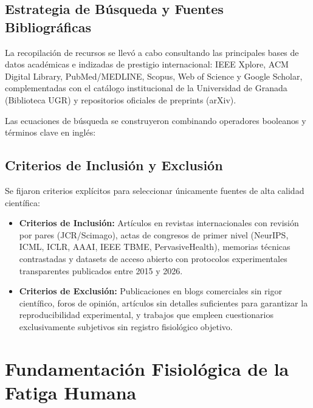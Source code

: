 \subsection{Estrategia de Búsqueda y Fuentes Bibliográficas}

La recopilación de recursos se llevó a cabo consultando las principales bases de datos académicas e indizadas de prestigio internacional: IEEE Xplore, ACM Digital Library, PubMed/MEDLINE, Scopus, Web of Science y Google Scholar, complementadas con el catálogo institucional de la Universidad de Granada (Biblioteca UGR) y repositorios oficiales de preprints (arXiv).

Las ecuaciones de búsqueda se construyeron combinando operadores booleanos y términos clave en inglés:
\begin{center}
\small
{}
\end{center}

\subsection{Criterios de Inclusión y Exclusión}

Se fijaron criterios explícitos para seleccionar únicamente fuentes de alta calidad científica:
\begin{itemize}
    \item \textbf{Criterios de Inclusión:} Artículos en revistas internacionales con revisión por pares (JCR/Scimago), actas de congresos de primer nivel (NeurIPS, ICML, ICLR, AAAI, IEEE TBME, PervasiveHealth), memorias técnicas contrastadas y datasets de acceso abierto con protocolos experimentales transparentes publicados entre 2015 y 2026.
    \item \textbf{Criterios de Exclusión:} Publicaciones en blogs comerciales sin rigor científico, foros de opinión, artículos sin detalles suficientes para garantizar la reproducibilidad experimental, y trabajos que empleen cuestionarios exclusivamente subjetivos sin registro fisiológico objetivo.
\end{itemize}



\section{Fundamentación Fisiológica de la Fatiga Humana}
\label{sec:teoria_fisiologia}

